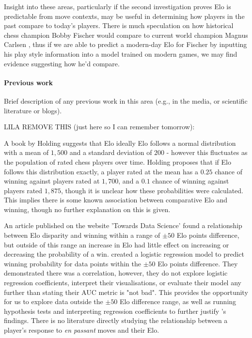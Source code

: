 \documentclass[10pt,a4paper]{article}
\begin{document}
\begin{multicols}{2}
Insight into these areas, particularly if the second investigation proves Elo is predictable from move contexts, may be useful in determining how players in the past compare to today's players. There is much speculation on how historical chess champion Bobby Fischer would compare to current world champion Magnus Carlsen \cite{BobbyFischerVsMagnusCarlsen}, thus if we are able to predict a modern-day Elo for Fischer by inputting his play style information into a model trained on modern games, we may find evidence suggesting how he'd compare.

\paragraph{Previous work}

Brief description of any previous work in this area (e.g., in the
media, or scientific literature or blogs).

LILA REMOVE THIS (just here so I can remember tomorrow):



A book by Holding \cite{PsychologyOfChessSkill} suggests that Elo ideally Elo follows a normal distribution with a mean of $1,500$ and a standard deviation of $200$ - however this fluctuates as the population of rated chess players over time. Holding \cite{PsychologyOfChessSkill} proposes that if Elo follows this distribution exactly, a player rated at the mean has a $0.25$ chance of winning against players rated at $1,700$, and a $0.1$ chance of winning against players rated $1,875$, though it is unclear how these probabilities were calculated. This implies there is some known association between comparative Elo and winning, though no further explanation on this is given.

An article published on the website 'Towards Data Science' \cite{HowMuchDoesEloMatter} found a relationship between Elo disparity and winning within a range of $\pm 50$ Elo points difference, but outside of this range an increase in Elo had little effect on increasing or decreasing the probability of a win. \cite{HowMuchDoesEloMatter} created a logistic regression model to predict winning probability for data points within the $\pm 50$ Elo points difference. They demonstrated there was a correlation, however, they do not explore logistic regression coefficients, interpret their visualisations, or evaluate their model any further than stating their AUC metric is "not bad". This provides the opportunity for us to explore data outside the $\pm 50$ Elo difference range, as well as running hypothesis tests and interpreting regression coefficients to further justify \cite{HowMuchDoesEloMatter}'s findings.
There is no literature directly studying the relationship between a player's response to \textit{en passant} moves and their Elo.

\end{multicols}
\end{document}
